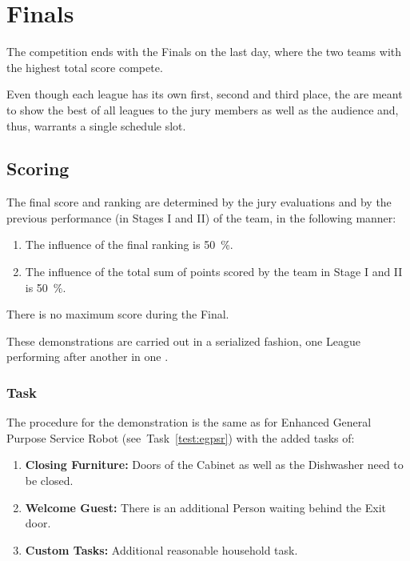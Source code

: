 \chapter{Finals}

The competition ends with the Finals on the last day, where the two teams with the highest total score compete.

Even though each league has its own first, second and third place, the  are meant to show the best of all leagues to the jury members as well as the audience and, thus, warrants a single schedule slot.

\section{Scoring}
The final score and ranking are determined by the jury evaluations and by the previous performance (in Stages I and II) of the team, in the following manner:

\begin{enumerate}
  \item The influence of the final ranking is \SI{50}{\percent}.
  \item The influence of the total sum of points scored by the team in Stage I and II is \SI{50}{\percent}.
\end{enumerate}

There is no maximum score during the Final.

These demonstrations are carried out in a serialized fashion, one League performing after another in one \Arena{}.

\subsection{Task}
The procedure for the demonstration is the same as for Enhanced General Purpose Service Robot (see~Task~\ref{test:egpsr}) with the added tasks of:

\begin{enumerate}[nosep]
\item \textbf{Closing Furniture:} Doors of the Cabinet as well as the Dishwasher need to be closed.
\item \textbf{Welcome Guest:} There is an additional Person waiting behind the Exit door.
\item \textbf{Custom Tasks:} Additional reasonable household task.
\end{enumerate}

